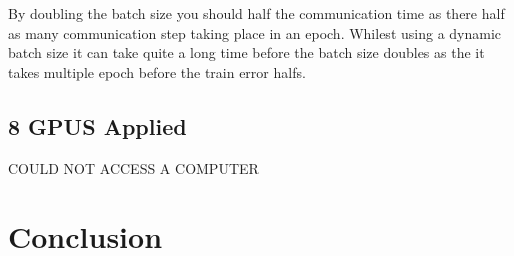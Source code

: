 \documentclass[11pt]{article}
\begin{document}
By doubling the batch size you should half the communication time as there half as many communication step taking place in an epoch. Whilest using a dynamic batch size it can take quite a long time before the batch size doubles as the it takes multiple epoch before the train error halfs.


\subsection{8 GPUS Applied}
\begin{Huge}
\begin{center}
COULD NOT ACCESS A COMPUTER
\end{center}
\end{Huge}


\section{Conclusion}
 
\end{document}

